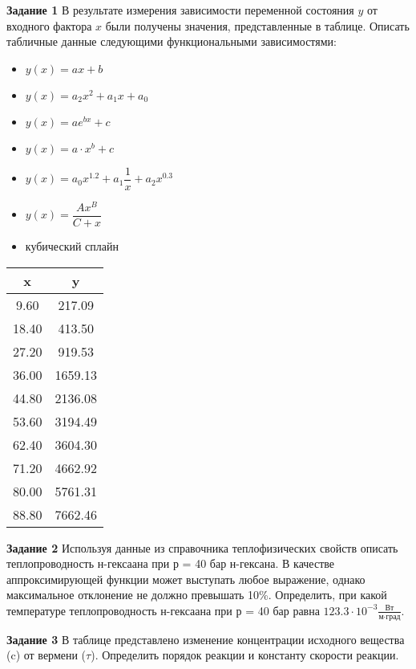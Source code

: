 \textbf{Задание 1} В результате измерения зависимости переменной состояния $y$ от входного фактора $x$ были получены значения, представленные в таблице. Описать табличные данные следующими функциональными зависимостями:
 \begin{itemize} 
\item $y(x)=a x+b$
\item $y(x)=a_2 x^2 + a_1 x +a_0$
\item $y(x)=a e^{b x}+c  $
\item $y(x)=a \cdot x^b+c$
\item $y(x)=a_0 x^{1.2}               +a_1 \dfrac{1}{x}           +a_2 x^{0.3}               $
\item $y(x)=\dfrac{A x^B} {C+x}                $
\item кубический сплайн        
\end{itemize}
\begin{table}[h]
\begin{tabular}{|c|c|}
\hline
x & y \\ \hline
 9.60 &     217.09 \\ \hline 
18.40 &     413.50 \\ \hline 
27.20 &     919.53 \\ \hline 
36.00 &    1659.13 \\ \hline 
44.80 &    2136.08 \\ \hline 
53.60 &    3194.49 \\ \hline 
62.40 &    3604.30 \\ \hline 
71.20 &    4662.92 \\ \hline 
80.00 &    5761.31 \\ \hline 
88.80 &    7662.46 \\ \hline 
\end{tabular}
\end{table}

\textbf{Задание 2}  Используя данные из справочника теплофизических свойств описать теплопроводность н-гексаана при р = 40 бар н-гексана. В качестве аппроксимирующей функции может выступать любое выражение, однако максимальное отклонение не должно превышать 10\%. Определить, при какой температуре теплопроводность н-гексаана при р = 40 бар равна $   123.3 \cdot 10^{-3} \frac {\text{Вт}} {\text{м} \cdot \text{град}}$.

\textbf{Задание 3} В таблице представлено изменение концентрации исходного вещества (c) от вермени ($\tau$). Определить порядок реакции и константу скорости реакции.


